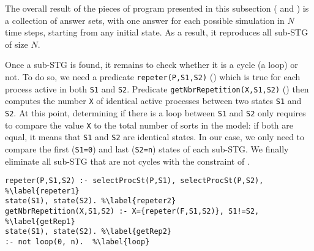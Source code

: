 The overall result of the pieces of program presented in this subsection
( and )
is a collection of answer sets,
with one answer for each possible simulation in $N$ time steps,
starting from any initial state.
As a result, it reproduces all sub-STG of size $N$.

Once a sub-STG is found, it remains to check whether it is a cycle (\ie a loop) or not.
To do so, we need a predicate \texttt{repeter(P,S1,S2)} () which is true for each process active in both \texttt{S1} and \texttt{S2}.
Predicate \texttt{getNbrRepetition(X,S1,S2)} () then computes the number \texttt{X} of identical active processes between two states \texttt{S1} and \texttt{S2}.
At this point, determining if there is a loop between \texttt{S1} and \texttt{S2}
only requires to compare the value \texttt{X} to the total number of sorts in the model:
if both are equal, it means that \texttt{S1} and \texttt{S2} are identical states.
In our case, we only need to compare the first (\texttt{S1=0}) and last (\texttt{S2=n}) states of each sub-STG.
We finally eliminate all sub-STG that are not cycles with the constraint of .
\begin{lstlisting}
repeter(P,S1,S2) :- selectProcSt(P,S1), selectProcSt(P,S2), %\label{repeter1}
state(S1), state(S2). %\label{repeter2}
getNbrRepetition(X,S1,S2) :- X={repeter(F,S1,S2)}, S1!=S2, %\label{getRep1}
state(S1), state(S2). %\label{getRep2}
:- not loop(0, n).  %\label{loop}
\end{lstlisting}

